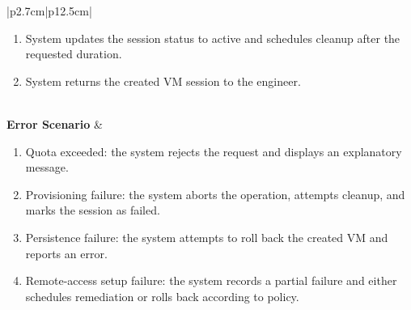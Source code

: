 \begin{table}[H]
\begin{tabular}{|p{2.7cm}|p{12.5cm}|}
\begin{minipage}[t]{\linewidth}
\begin{enumerate}[topsep=0pt,itemsep=1pt,parsep=0pt,partopsep=0pt]
                \item System updates the session status to active and schedules cleanup after the requested duration.
                \item System returns the created VM session to the engineer.
            \end{enumerate}
        \end{minipage} \\
        \hline
        \textbf{Error Scenario} & \begin{minipage}[t]{\linewidth}
            \begin{enumerate}[topsep=0pt,itemsep=1pt,parsep=0pt,partopsep=0pt]
                \item Quota exceeded: the system rejects the request and displays an explanatory message.
                \item Provisioning failure: the system aborts the operation, attempts cleanup, and marks the session as failed.
                \item Persistence failure: the system attempts to roll back the created VM and reports an error.
                \item Remote-access setup failure: the system records a partial failure and either schedules remediation or rolls back according to policy.
            \end{enumerate}
        \end{minipage} \\
        \hline
    \end{tabular}
    \label{tab:eng-provision-vm}
\end{table}

